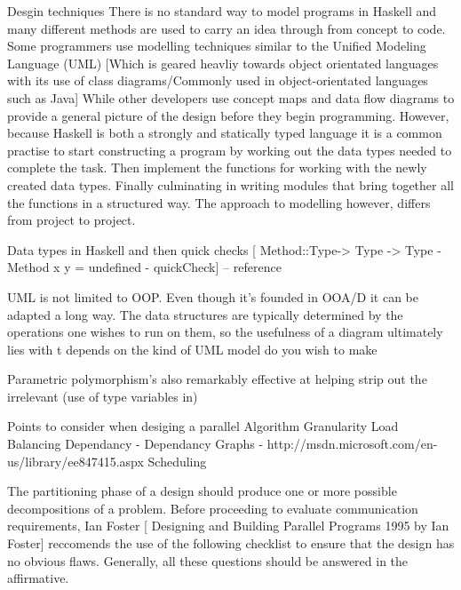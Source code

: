 \documentclass[main.tex]{subfiles}
\begin{document}
Desgin techniques
There is no standard way to model programs in Haskell and many different methods are used to carry an idea through from concept to code. Some programmers use modelling techniques similar to the Unified Modeling Language (UML) [Which is geared heavliy towards object orientated languages with its use of class diagrams/Commonly used in object-orientated languages such as Java] While other developers use concept maps and data flow diagrams to provide a general picture of the design before they begin programming. However, because Haskell is both a strongly and statically typed language it is a common practise to start constructing a program by working out the data types needed to complete the task. Then implement the functions for working with the newly created data types. Finally culminating in writing modules that bring together all the functions in a structured way. The approach to modelling however, differs from project to project.

Data types in Haskell and then quick checks [ Method::Type-> Type -> Type  - Method x y = undefined  - quickCheck]
-- reference

UML is not limited to OOP. Even though it's founded in OOA/D it can be adapted a long way. The data structures are typically determined by the operations one wishes to run on them, so the usefulness of a diagram ultimately lies with t depends on the kind of UML model do you wish to make

Parametric polymorphism's also remarkably effective at helping strip out the irrelevant (use of type variables in)


Points to consider when desiging a parallel Algorithm
Granularity
Load Balancing
Dependancy - Dependancy Graphs - http://msdn.microsoft.com/en-us/library/ee847415.aspx
Scheduling

The partitioning phase of a design should produce one or more possible   decompositions of a problem. Before proceeding to evaluate communication requirements, Ian Foster [ Designing and Building Parallel Programs  1995 by Ian Foster] reccomends the use of the following checklist to ensure that the design has no obvious flaws. Generally, all these questions should be answered in the affirmative.
\end{document}
